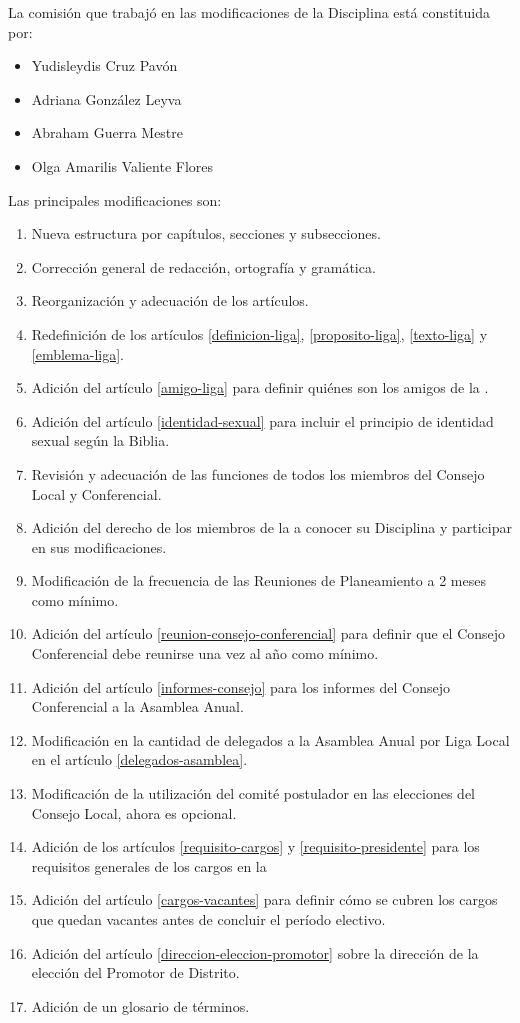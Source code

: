 
La comisión que trabajó en las modificaciones de la Disciplina está constituida por:
\begin{itemize}
    \item Yudisleydis Cruz Pavón
    \item Adriana González Leyva
    \item Abraham Guerra Mestre
    \item Olga Amarilis Valiente Flores
\end{itemize}

Las principales modificaciones son:
\begin{enumerate}
    \item Nueva estructura por capítulos, secciones y subsecciones.
    \item Corrección general de redacción, ortografía y gramática.
    \item Reorganización y adecuación de los artículos.
    \item Redefinición de los artículos \ref{definicion-liga}, \ref{proposito-liga}, \ref{texto-liga} y \ref{emblema-liga}.
    \item Adición del artículo \ref{amigo-liga} para definir quiénes son los amigos de la \LMJ{}.
    \item Adición del artículo \ref{identidad-sexual} para incluir el principio de identidad sexual según la Biblia.
    \item Revisión y adecuación de las funciones de todos los miembros del Consejo Local y Conferencial.
    \item Adición del derecho de los miembros de la \LMJ{} a conocer su Disciplina y participar en sus modificaciones.
    \item Modificación de la frecuencia de las Reuniones de Planeamiento a 2 meses como mínimo.
    \item Adición del artículo \ref{reunion-consejo-conferencial} para definir que el Consejo Conferencial debe reunirse una vez al año como mínimo.
    \item Adición del artículo \ref{informes-consejo} para los informes del Consejo Conferencial a la Asamblea Anual.
    \item Modificación en la cantidad de delegados a la Asamblea Anual por Liga Local en el artículo \ref{delegados-asamblea}.
    \item Modificación de la utilización del comité postulador en las elecciones del Consejo Local, ahora es opcional.
    \item Adición de los artículos \ref{requisito-cargos} y \ref{requisito-presidente} para los requisitos generales de los cargos en la \LMJ{}
    \item Adición del artículo \ref{cargos-vacantes} para definir cómo se cubren los cargos que quedan vacantes antes de concluir el período electivo.
    \item Adición del artículo \ref{direccion-eleccion-promotor} sobre la dirección de la elección del Promotor de Distrito.
    \item Adición de un glosario de términos.
\end{enumerate}
